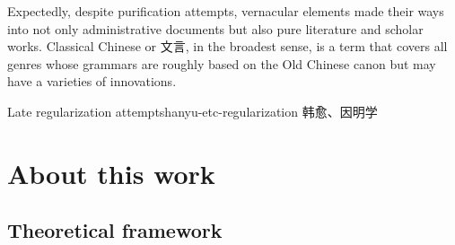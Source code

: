 \documentclass[UTF8, a4paper, oneside, scheme=plain, 12pt]{ctexrep}
\begin{document}
Expectedly, despite purification attempts,
vernacular elements made their ways into not only administrative documents
but also pure literature and scholar works.
Classical Chinese or 文言, in the broadest sense,
is a term that covers all genres whose grammars are roughly based on the Old Chinese canon
but may have a varieties of innovations.

\begin{todobox}{Late regularization attempts}{hanyu-etc-regularization}
    韩愈、因明学
\end{todobox}

\section{About this work}

\subsection{Theoretical framework}\label{sec:intro.theory}
\end{document}
